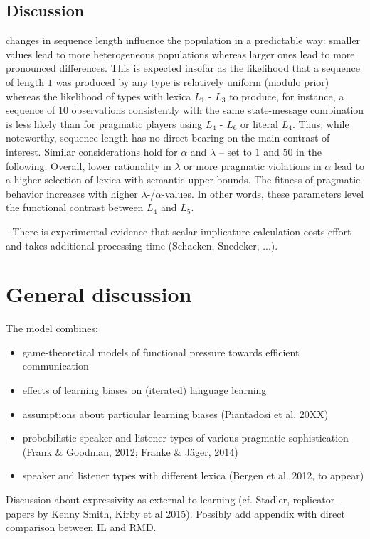 \documentclass[a4paper]{article}
\begin{document}
\subsection{Discussion}
changes in sequence length influence the population in a predictable way: smaller values lead to more heterogeneous populations whereas larger ones lead to more pronounced differences. This is expected insofar as the likelihood that a sequence of length $1$ was produced by any type is relatively uniform (modulo prior) whereas the likelihood of types with lexica $L_1$ - $L_3$ to produce, for instance, a sequence of $10$ observations consistently with the same state-message combination is less likely than for pragmatic players using $L_4$ - $L_6$ or literal $L_4$. Thus, while noteworthy, sequence length has no direct bearing on the main contrast of interest. Similar considerations hold for $\alpha$ and $\lambda$ -- set to $1$ and $50$ in the following. Overall, lower rationality in $\lambda$ or more pragmatic violations in $\alpha$ lead to a higher selection of lexica with semantic upper-bounds. The fitness of pragmatic behavior increases with higher $\lambda$-/$\alpha$-values. In other words, these parameters level the functional contrast between $L_4$ and $L_5$. 
 


- There is experimental evidence that scalar implicature calculation costs effort and takes additional processing time (Schaeken, Snedeker, ...).

\section{General discussion}

The model combines:
\begin{itemize}
  \item game-theoretical models of functional pressure towards efficient communication
  \item effects of learning biases on (iterated) language learning
  \item assumptions about particular learning biases (Piantadosi et al. 20XX)
  \item probabilistic speaker and listener types of various pragmatic sophistication (Frank \& Goodman, 2012; Franke \& Jäger, 2014)
  \item speaker and listener types with different lexica (Bergen et al. 2012, to appear)
\end{itemize}

Discussion about expressivity as external to learning (cf. Stadler, replicator-papers by Kenny Smith, Kirby et al 2015). Possibly add appendix with direct comparison between IL and RMD.
\end{document}
